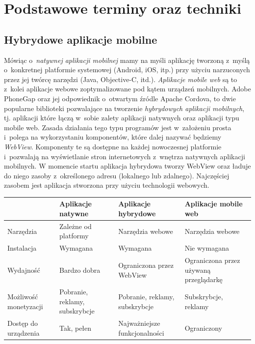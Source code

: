 \documentclass{xmgr}
\begin{document}
\chapter{Podstawowe terminy oraz techniki}
\section{Hybrydowe aplikacje mobilne}
Mówiąc o~\textit{natywnej aplikacji mobilnej} mamy na myśli aplikację tworzoną z~myślą o~konkretnej platformie systemowej (Android, iOS, itp.) przy użyciu narzuconych przez jej twórcę narzędzi (Java, Objective-C, itd.).  \textit{Aplikacje mobile web} są to z~kolei aplikacje webowe zoptymalizowane pod kątem urządzeń mobilnych.
Adobe PhoneGap oraz jej odpowiednik o~otwartym źródle Apache Cordova, to
dwie popularne biblioteki pozwalające na tworzenie \textit{hybrydowych aplikacji
mobilnych}, tj. aplikacji które łączą w~sobie zalety aplikacji natywnych oraz aplikacji
typu mobile web. Zasada działania tego typu programów jest w~założeniu prosta i~polega na wykorzystaniu komponentów, które dalej nazywać będziemy \textit{WebView}.
Komponenty te są dostępne na każdej nowoczesnej platformie i~pozwalają na
wyświetlanie stron internetowych z~wnętrza natywnych aplikacji mobilnych. 
W momencie startu aplikacja hybrydowa tworzy WebView oraz ładuje do niego zasoby z~określonego adresu (lokalnego lub zdalnego). Najczęściej zasobem jest aplikacja stworzona przy użyciu technologii webowych.     


\begin{center}
    \begin{tabularx}{\textwidth}{ | X | X | X | X |}
    \hline & Aplikacje naty\-wne&Aplikacje hybrydowe&Aplikacje mobile web\\ 
    \hline Narzędzia&Zależne od platformy	&Narzędzia webowe&Narzędzia webowe\\
    \hline Instalacja&Wymagana&Wymagana&Nie wymagana\\ 
    \hline Wydajność&Bardzo dobra&Ograniczona przez WebView&Ograniczona przez używaną przeglądarkę\\ 
   \hline Możliwość monetyzacji&Pobranie, reklamy, subskrybcje&Pobranie, reklamy, subskrybcje&Subskrybcje, reklamy\\ 
  \hline Dostęp do urządzenia&Tak, pełen&Najważniejsze funkcjonalności& Ograniczony\\ 
  \hline
  \end{tabularx}
\end{center}
\end{document}
